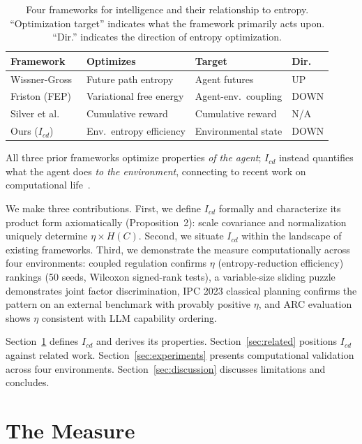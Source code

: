 \documentclass[runningheads,a4paper]{llncs}
\begin{document}
\begin{table}[t]
\centering
\caption{Four frameworks for intelligence and their relationship to entropy. ``Optimization target'' indicates what the framework primarily acts upon. ``Dir.'' indicates the direction of entropy optimization.}
\label{tab:entropy-triangle}
\small
\begin{tabular}{llll}
\toprule
Framework & Optimizes & Target & Dir.\ \\
\midrule
Wissner-Gross~\cite{wissner2013causal} & Future path entropy & Agent futures & UP \\
Friston (FEP)~\cite{friston2010free} & Variational free energy & Agent-env.\ coupling & DOWN \\
Silver et al.~\cite{silver2021reward} & Cumulative reward & Cumulative reward & N/A \\
Ours ($I_{cd}$) & Env.\ entropy efficiency & Environmental state & DOWN \\
\bottomrule
\end{tabular}
\end{table}

All three prior frameworks optimize properties \emph{of the agent}; $I_{cd}$ instead quantifies what the agent does \emph{to the environment}, connecting to recent work on computational life~\cite{aguerayarcas2024computational}.

We make three contributions. First, we define $I_{cd}$ formally and characterize its product form axiomatically (Proposition~2): scale covariance and normalization uniquely determine $\eta \times H(C)$. Second, we situate $I_{cd}$ within the landscape of existing frameworks. Third, we demonstrate the measure computationally across four environments: coupled regulation confirms $\eta$ (entropy-reduction efficiency) rankings (50 seeds, Wilcoxon signed-rank tests), a variable-size sliding puzzle demonstrates joint factor discrimination, IPC 2023 classical planning confirms the pattern on an external benchmark with provably positive $\eta$, and ARC evaluation shows $\eta$ consistent with LLM capability ordering.

Section~\ref{sec:measure} defines $I_{cd}$ and derives its properties. Section~\ref{sec:related} positions $I_{cd}$ against related work. Section~\ref{sec:experiments} presents computational validation across four environments. Section~\ref{sec:discussion} discusses limitations and concludes.

\section{The Measure}
\label{sec:measure}
\end{document}
